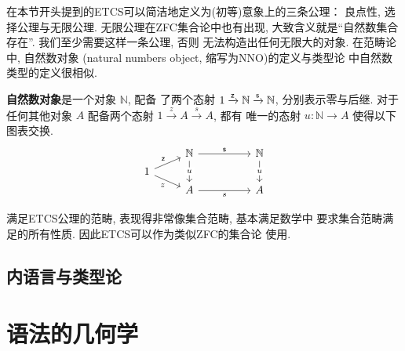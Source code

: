 在本节开头提到的ETCS可以简洁地定义为(初等)意象上的三条公理：
良点性, 选择公理与无限公理. 无限公理在ZFC集合论中也有出现,
大致含义就是“自然数集合存在”. 我们至少需要这样一条公理, 否则
无法构造出任何无限大的对象. 在范畴论中, 自然数对象
(natural numbers object, 缩写为NNO)的定义与类型论
中自然数类型的定义很相似.
\begin{definition}
\textbf{自然数对象}是一个对象 \(\mathbb N\), 配备
了两个态射 \(1 \xrightarrow{\textnormal{\textsf{z}}} \mathbb N \xrightarrow{\textnormal{\textsf{s}}} \mathbb N\),
分别表示零与后继. 对于任何其他对象 \(A\) 配备两个态射
\(1 \xrightarrow z A \xrightarrow s A\), 都有
唯一的态射 \(u : \mathbb N \to A\) 使得以下图表交换.
\[\begin{tikzcd}[row sep=3]
& {\mathbb N} && {\mathbb N} \\
1 \\
& A && A
\arrow["z"', from=2-1, to=3-2]
\arrow["s"', from=3-2, to=3-4]
\arrow["{\cons{z}}", from=2-1, to=1-2]
\arrow["{\cons{s}}", from=1-2, to=1-4]
\arrow["u"{description}, from=1-2, to=3-2]
\arrow["u"{description}, from=1-4, to=3-4]
\end{tikzcd}\]
\end{definition}
满足ETCS公理的范畴, 表现得非常像集合范畴, 基本满足数学中
要求集合范畴满足的所有性质. 因此ETCS可以作为类似ZFC的集合论
使用.

\subsection{内语言与类型论}

\section{语法的几何学}

